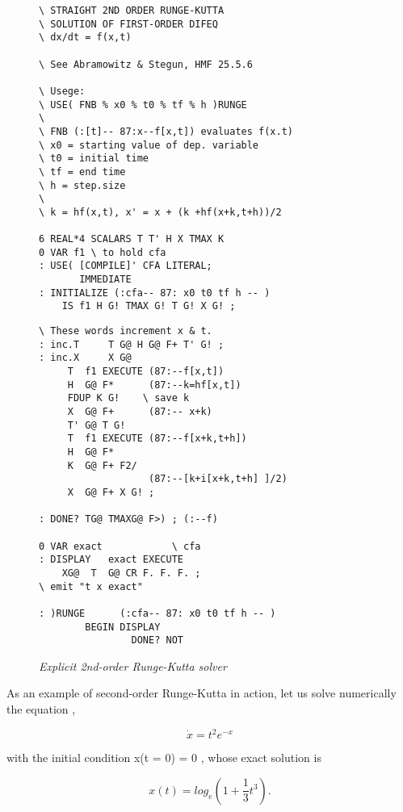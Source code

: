 \begin{figure}
    \tiny
    \begin{tcolorbox} [sidebyside, colback=white, sharp corners, enhanced, segmentation style=solid]
    \begin{lstlisting}
\ STRAIGHT 2ND ORDER RUNGE-KUTTA
\ SOLUTION OF FIRST-ORDER DIFEQ
\ dx/dt = f(x,t)

\ See Abramowitz & Stegun, HMF 25.5.6

\ Usege:
\ USE( FNB % x0 % t0 % tf % h )RUNGE
\
\ FNB (:[t]-- 87:x--f[x,t]) evaluates f(x.t)
\ x0 = starting value of dep. variable
\ t0 = initial time
\ tf = end time
\ h = step.size
\
\ k = hf(x,t), x' = x + (k +hf(x+k,t+h))/2

6 REAL*4 SCALARS T T' H X TMAX K
0 VAR f1 \ to hold cfa
: USE( [COMPILE]' CFA LITERAL;
       IMMEDIATE
: INITIALIZE (:cfa-- 87: x0 t0 tf h -- )
    IS f1 H G! TMAX G! T G! X G! ;
    \end{lstlisting}
\tcblower
    \begin{lstlisting}
\ These words increment x & t.
: inc.T     T G@ H G@ F+ T' G! ;
: inc.X     X G@
     T  f1 EXECUTE (87:--f[x,t])
     H  G@ F*      (87:--k=hf[x,t])
     FDUP K G!    \ save k
     X  G@ F+      (87:-- x+k)
     T' G@ T G!
     T  f1 EXECUTE (87:--f[x+k,t+h])
     H  G@ F*
     K  G@ F+ F2/
                   (87:--[k+i[x+k,t+h] ]/2)
     X  G@ F+ X G! ;

: DONE? TG@ TMAXG@ F>) ; (:--f)

0 VAR exact            \ cfa
: DISPLAY   exact EXECUTE
    XG@  T  G@ CR F. F. F. ;
\ emit "t x exact"

: )RUNGE      (:cfa-- 87: x0 t0 tf h -- )
        BEGIN DISPLAY
                DONE? NOT
    \end{lstlisting}
    \end{tcolorbox}
    \caption{\textit{Explicit 2nd-order Runge-Kutta solver}}
    \label{fig:06_07}
\end{figure}

As an example of second-order Runge-Kutta in action, let us solve numerically the equation ,

\begin{equation}
    \dot{x} = t^2 e^{-x}
    \label{eq:06_21} 
\end{equation}

with the initial condition x(t = 0) = 0 , whose exact solution is

\begin{equation}
    x(t) =log_e(1 +\frac{1}{3}t^3).
    \label{eq:06_22} 
\end{equation}

